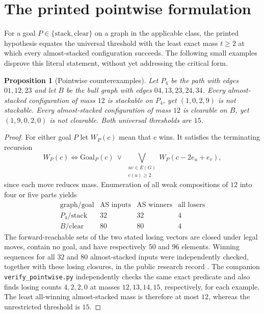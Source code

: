 \documentclass[10pt,a4paper]{article}
\newtheorem{proposition}{Proposition}[section]
\begin{document}
\section{The printed pointwise formulation}
For a goal $P\in\{\mathrm{stack},\mathrm{clear}\}$ on a graph in the
applicable class, the printed hypothesis equates the universal threshold
with the least exact mass $t\ge2$ at which every almost-stacked
configuration succeeds. The following small examples disprove this
literal statement, without yet addressing the critical form.

\begin{proposition}[Pointwise counterexamples]\label{prop:pointwise}
Let $P_4$ be the path with edges $01,12,23$ and let $B$ be
the bull graph with edges $04,13,23,24,34$.
Every almost-stacked configuration of mass $12$ is stackable on
$P_4$, yet $(1,0,2,9)$ is not stackable.
Every almost-stacked configuration of mass $12$ is clearable on
$B$, yet $(1,9,0,2,0)$ is not clearable.
Both universal thresholds are $15$.
\end{proposition}

\begin{proof}
For either goal $P$ let $W_P(c)$ mean that $c$ wins. It satisfies
the terminating recursion
\[
 W_P(c)\Longleftrightarrow \mathrm{Goal}_P(c)\ \lor\
 \bigvee_{\substack{uv\in E(G)\\c(u)\ge2}}W_P(c-2e_u+e_v),
\]
since each move reduces mass. Enumeration of all weak compositions
of $12$ into four or five parts yields
\[
\begin{array}{c|r|r|r}
\text{graph/goal}&\text{AS inputs}&\text{AS winners}&
\text{all losers}\\ \hline
P_4/\mathrm{stack}&32&32&4\\
B/\mathrm{clear}&80&80&4
\end{array}
\]
The forward-reachable sets of the two stated losing vectors are closed
under legal moves, contain no goal, and have respectively $50$ and
$96$ elements. Winning sequences for all $32$ and $80$
almost-stacked inputs were independently checked, together with
these losing closures, in the public research record \cite{Repo}.
The companion \texttt{verify\_pointwise.py} independently checks the
same exact predicate and also finds losing counts $4,2,2,0$
at masses $12,13,14,15$, respectively, for each example.
The least all-winning almost-stacked mass is therefore at most $12$,
whereas the unrestricted threshold is $15$.
\end{proof}
\end{document}
